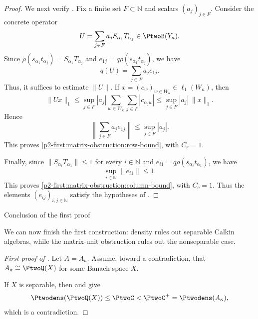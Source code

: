 \documentclass[11pt,reqno]{amsart}
\makeatletter
\theoremstyle{plain}
\theoremstyle{definition}
\newcommand{\N}{\mathbb N}
\newcounter{problempaper}
\newenvironment{problempaperbody}{%
  \setcounter{subsection}{0}%
  \setcounter{subsubsection}{0}%
  \setcounter{paragraph}{0}%
  \renewcommand{\thesubsection}{\arabic{subsection}}%
  \renewcommand{\thesubsubsection}{\thesubsection.\arabic{subsubsection}}%
  \renewcommand{\theparagraph}{\thesubsubsection.\arabic{paragraph}}%
  \let\problem@outersection\section
  \let\problem@outersubsection\subsection
  \let\problem@outersubsubsection\subsubsection
  \let\problem@outerparagraph\paragraph
  \let\section\problem@papersection
  \let\subsection\problem@papersubsection
  \let\subsubsection\problem@papersubsubsection
}{%
  \let\section\problem@outersection
  \let\subsection\problem@outersubsection
  \let\subsubsection\problem@outersubsubsection
  \let\paragraph\problem@outerparagraph
}
\newcommand{\problem@target}[2]{%
  \hypertarget{problem-\theproblempaper-#1-#2}{}%
}
\newcommand{\problem@paperheading}[3]{%
  \par\bigskip
  \problem@target{#1}{#2}%
  \noindent{\large\bfseries #2.\quad #3\par}%
  \nobreak\smallskip
}
\newcommand{\problem@papersubheading}[3]{%
  \par\medskip
  \problem@target{#1}{#2}%
  \noindent{\normalsize\bfseries #2.\quad #3\par}%
  \nobreak\smallskip
}
\newcommand{\problem@papersubsubheading}[3]{%
  \par\smallskip
  \problem@target{#1}{#2}%
  \noindent{\normalsize\itshape #2.\quad #3.\ }%
}
\def\problem@papersection{%
  \@ifstar{\problem@papersectionstar}{\problem@papersectionnostar}%
}
\def\problem@papersectionstar#1{%
  \par\bigskip\noindent{\large\bfseries #1\par}\nobreak\smallskip
}
\def\problem@papersectionnostar#1{%
  \refstepcounter{subsection}%
  \setcounter{subsubsection}{0}%
  \setcounter{paragraph}{0}%
  \problem@paperheading{section}{\thesubsection}{#1}%
  \problem@writecontentsline{section}{\thesubsection}{#1}%
}
\def\problem@papersubsection{%
  \@ifstar{\problem@papersubsectionstar}{\problem@papersubsectionnostar}%
}
\def\problem@papersubsectionstar#1{%
  \par\medskip\noindent{\normalsize\bfseries #1\par}\nobreak\smallskip
}
\def\problem@papersubsectionnostar#1{%
  \refstepcounter{subsubsection}%
  \setcounter{paragraph}{0}%
  \problem@papersubheading{subsection}{\thesubsubsection}{#1}%
  \problem@writecontentsline{subsection}{\thesubsubsection}{#1}%
}
\def\problem@papersubsubsection{%
  \@ifstar{\problem@papersubsubsectionstar}{\problem@papersubsubsectionnostar}%
}
\def\problem@papersubsubsectionstar#1{%
  \par\smallskip\noindent{\normalsize\itshape #1.\ }%
}
\def\problem@papersubsubsectionnostar#1{%
  \refstepcounter{paragraph}%
  \problem@papersubsubheading{subsubsection}{\theparagraph}{#1}%
  \problem@writecontentsline{subsubsection}{\theparagraph}{#1}%
}
\newcommand{\problem@writecontentsline}[3]{%
  \begingroup
  \protected@write\@auxout{}{%
    \string\problemcontentsentry{\theproblempaper}{#1}{#2}{#3}{\thepage}%
  }%
  \endgroup
}
\newcommand{\problemcontentsentry}[5]{%
  \@ifundefined{problemcontents@#1}{%
    \expandafter\gdef\csname problemcontents@#1\endcsname{}%
  }{}%
  \expandafter\g@addto@macro\csname problemcontents@#1\endcsname{%
    \problemcontentsline{#1}{#2}{#3}{#4}{#5}%
  }%
}
\newcommand{\problemcontentslink}[4]{%
  \hyperlink{problem-#1-#2-#3}{#4}%
}
\newcommand{\problemcontentsline}[5]{%
  \ifstrequal{#2}{section}{%
    \par\noindent
    \problemcontentslink{#1}{#2}{#3}{\makebox[2.5em][l]{#3}#4}%
    \nobreak\dotfill
    \problemcontentslink{#1}{#2}{#3}{#5}\par
  }{%
    \ifstrequal{#2}{subsection}{%
      \par\noindent\hspace*{1.5em}%
      \problemcontentslink{#1}{#2}{#3}{\makebox[3.5em][l]{#3}#4}%
      \nobreak\dotfill
      \problemcontentslink{#1}{#2}{#3}{#5}\par
    }{%
      \par\noindent\hspace*{3em}%
      \problemcontentslink{#1}{#2}{#3}{\makebox[4.5em][l]{#3}#4}%
      \nobreak\dotfill
      \problemcontentslink{#1}{#2}{#3}{#5}\par
    }%
  }%
}
\makeatother
\begin{document}
\begin{problempaperbody}
\begin{proof}
We next verify . Fix a finite set $F\subset\N$ and scalars $(a_j)_{j\in F}$. Consider the concrete operator
\begin{equation*}
        U=\sum_{j\in F}a_jS_{\alpha_1}T_{\alpha_j}\in\PtwoB(Y_\kappa).
\end{equation*}
Since $\rho(s_{\alpha_1}t_{\alpha_j})=S_{\alpha_1}T_{\alpha_j}$ and $e_{1j}=q\rho(s_{\alpha_1}t_{\alpha_j})$, we have
\begin{equation*}
        q(U)=\sum_{j\in F}a_je_{1j}.
\end{equation*}
Thus, it suffices to estimate $\|U\|$.
If $x=(c_w)_{w\in W_\kappa}\in\ell_1(W_\kappa)$, then
\begin{equation*}
        \|Ux\|_1\leq \sup_{j\in F}|a_j|\sum_{w\in W_\kappa}\sum_{j\in F}|c_{\alpha_jw}|\leq \sup_{j\in F}|a_j|\,\|x\|_1.
\end{equation*}
Hence
\begin{equation*}
        \left\|\sum_{j\in F}a_je_{1j}\right\|\leq \sup_{j\in F}|a_j|.
\end{equation*}
This proves \ref{p2-first:matrix-obstruction:row-bound}, with $C_r=1$.

Finally, since $\|S_{\alpha_i}T_{\alpha_1}\|\leq1$ for every $i\in\N$ and $e_{i1}=q\rho(s_{\alpha_i}t_{\alpha_1})$, we have
\begin{equation*}
        \sup_{i\in\N}\|e_{i1}\|\leq1.
\end{equation*}
This proves \ref{p2-first:matrix-obstruction:column-bound}, with $C_c=1$. Thus the elements $(e_{ij})_{i,j\in\N}$ satisfy the hypotheses of .
\end{proof}

\subsection{Conclusion of the first proof}
\label{p2-first:sec:first-conclusion}

We can now finish the first construction: density rules out separable Calkin algebras, while the matrix-unit obstruction rules out the nonseparable case.

\begin{proof}[First proof of ]
Let $A=A_\kappa$. Assume, toward a contradiction, that $A_\kappa\cong\PtwoQ(X)$ for some Banach space $X$.

If $X$ is separable, then  and  give
\begin{equation*}
        \Ptwodens(\PtwoQ(X))\leq\PtwoC<\PtwoC^+=\Ptwodens(A_\kappa),
\end{equation*}
which is a contradiction.


\end{proof}
\end{problempaperbody}
\end{document}

